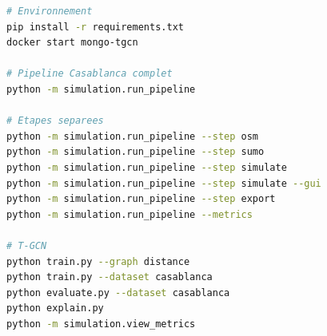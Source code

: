 \documentclass[12pt,a4paper]{report}
\begin{document}
\begin{lstlisting}[language=bash]
# Environnement
pip install -r requirements.txt
docker start mongo-tgcn

# Pipeline Casablanca complet
python -m simulation.run_pipeline

# Etapes separees
python -m simulation.run_pipeline --step osm
python -m simulation.run_pipeline --step sumo
python -m simulation.run_pipeline --step simulate
python -m simulation.run_pipeline --step simulate --gui
python -m simulation.run_pipeline --step export
python -m simulation.run_pipeline --metrics

# T-GCN
python train.py --graph distance
python train.py --dataset casablanca
python evaluate.py --dataset casablanca
python explain.py
python -m simulation.view_metrics
\end{lstlisting}
\end{document}
